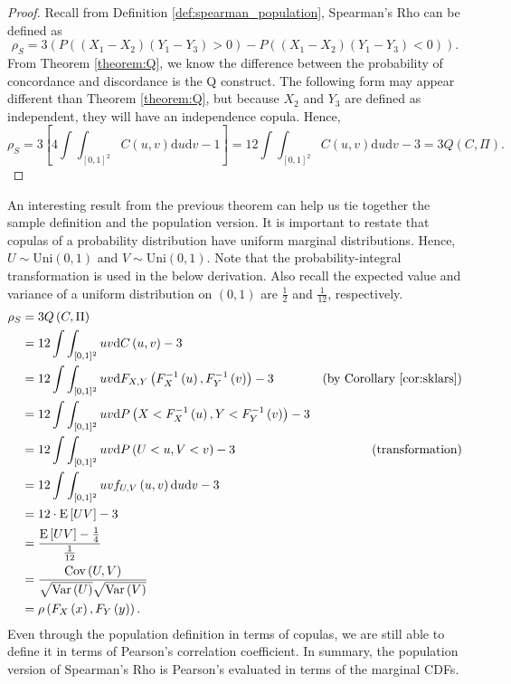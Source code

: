 \begin{proof}
    Recall from Definition \ref{def:spearman_population}, Spearman's Rho can be defined as $$\rho_S=3\left(P\left(\left(X_1-X_2\right)\left(Y_1-Y_3\right)>0\right)-P\left(\left(X_1-X_2\right)\left(Y_1-Y_3\right)<0\right)\right).$$ From Theorem \ref{theorem:Q}, we know the difference between the probability of concordance and discordance is the Q construct. The following form may appear different than Theorem \ref{theorem:Q}, but because $X_2$ and $Y_3$ are defined as independent, they will have an independence copula. Hence, $$\rho_S=3\left[4\int\int_{[0,1]^2}C\left(u,v\right)\mathrm{d}u\mathrm{d}v-1\right]=12\int\int_{[0,1]^2}C\left(u,v\right)\mathrm{d}u\mathrm{d}v-3=3Q\left(C,\Pi\right).$$
\end{proof}
An interesting result from the previous theorem can help us tie together the sample definition and the population version. It is important to restate that copulas of a probability distribution have uniform marginal distributions. Hence, $U\sim \text{Uni}\left(0,1\right)$ and $V\sim \text{Uni}\left(0,1\right)$. Note that the probability-integral transformation is used in the below derivation. Also recall the expected value and variance of a uniform distribution on $(0,1)$ are $\frac{1}{2}$ and $\frac{1}{12}$, respectively.
\begin{align*}
    \rho_S&=3Q\left(C,\Pi\right)\\
    &=12\int\int_{[0,1]^2}uv\mathrm{d}C\left(u,v\right)-3\\
    &=12\int\int_{[0,1]^2}uv\mathrm{d}F_{X,Y}\left(F_X^{-1}\left(u\right),F_Y^{-1}\left(v\right)\right)-3 &\text{(by Corollary \ref{cor:sklars})}\\
    &=12\int\int_{[0,1]^2}uv\mathrm{d}P\left(X<F_X^{-1}\left(u\right),Y<F_Y^{-1}\left(v\right)\right)-3\\
    &=12\int\int_{[0,1]^2}uv\mathrm{d}P\left(U<u,V<v\right)-3 &\text{(transformation)}\\
    &=12\int\int_{[0,1]^2}uvf_{U,V}\left(u,v\right)\mathrm{d}u\mathrm{d}v-3\\
    &=12\cdot \mathrm{E}\left[UV\right]-3\\
    &=\frac{\mathrm{E}\left[UV\right]-\frac{1}{4}}{\frac{1}{12}}\\
    &=\frac{\text{Cov}\left(U,V\right)}{\sqrt{\text{Var}\left(U\right)}\sqrt{\text{Var}\left(V\right)}}\\
    &=\rho\left(F_X\left(x\right),F_Y\left(y\right)\right).
\end{align*}
Even through the population definition in terms of copulas, we are still able to define it in terms of Pearson's correlation coefficient. In summary, the population version of Spearman's Rho is Pearson's evaluated in terms of the marginal CDFs.
